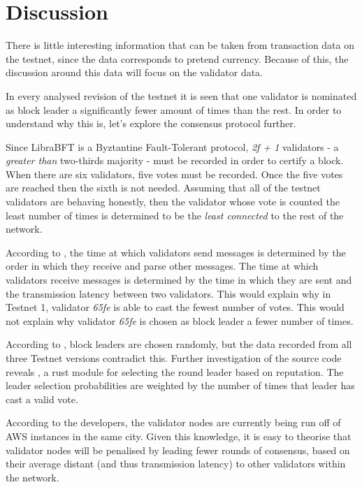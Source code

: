 \documentclass[12pt,openany,a4paper]{book}
\begin{document}
\section{Discussion}
\label{discussion}
There is little interesting information that can be taken from transaction data
on the testnet, since the data corresponds to pretend currency. Because of this,
the discussion around this data will focus on the validator data.

In every analysed revision of the testnet it is seen that one validator is nominated 
as block leader a significantly fewer amount of times than the rest. In order to understand why 
this is, let's explore the consensus protocol further.

Since LibraBFT is a Byztantine Fault-Tolerant protocol, \textit{2f + 1} validators 
- a \textit{greater than} two-thirds majority - must be recorded in order to certify a block.
When there are six validators, five votes must be recorded. Once the five votes are reached 
then the sixth is not needed. Assuming that all of the testnet validators are 
behaving honestly, then the validator whose vote is counted the least number of times 
is determined to be the \textit{least connected} to the rest of the network.

According to \cite{libra_technical_paper, libra_smr}, the time at which validators 
send messages is determined by the order in which they receive and parse other messages.
The time at which validators receive messages is determined by the time in which they are 
sent and the transmission latency between two validators. This would explain why 
in Testnet 1, validator \textit{65fe} is able to cast the fewest number of votes.
This would not explain why validator \textit{65fe} is chosen as block leader a fewer number of times.

According to \cite{libra_smr}, block leaders are chosen randomly, but the data recorded 
from all three Testnet versions contradict this. Further investigation of the source code reveals 
\cite{rep_source}, a rust module for selecting the round leader based on reputation.
The leader selection probabilities are weighted by the number of times that 
leader has cast a valid vote.

According to the developers, the validator nodes are currently being run off of 
AWS instances in the same city. Given this knowledge, it is easy to theorise that
validator nodes will be penalised by leading fewer rounds of consensus, based on their average 
distant (and thus transmission latency) to other validators within the network.
\end{document}
